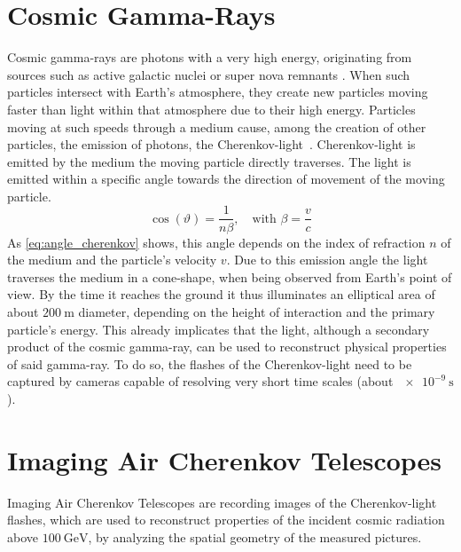 \section{Cosmic Gamma-Rays}
%
Cosmic gamma-rays are photons with a very high energy, originating from sources such as active galactic nuclei or super nova remnants \cite{FACT-Design}. When such particles intersect
with Earth's atmosphere, they create new particles moving faster than light
within that atmosphere due to their high energy. Particles moving at such
speeds through a medium cause, among the creation of other particles, the
emission of photons, the Cherenkov-light~\cite{Cherenkov}.
Cherenkov-light is emitted by the medium the moving particle directly traverses.
The light is emitted within a specific angle towards the direction of movement of the moving particle.
%
\begin{equation}
    \cos(\vartheta) = \frac{1}{n\beta}, \quad \text{with } \beta=\frac{v}{c}
    \label{eq:angle_cherenkov}
\end{equation}
%
As \autoref{eq:angle_cherenkov} shows, this angle depends on the index of
refraction $n$ of the medium and the particle's velocity $v$. Due to this emission
angle the light traverses the medium in a cone-shape, when being observed from
Earth's point of view. By the time it reaches the ground it thus
illuminates an elliptical area of about $\SI{200}{\meter}$ diameter, depending
on the height of interaction and the primary particle's energy.
This already implicates that the light, although a secondary product of the
cosmic gamma-ray, can be used to reconstruct physical properties of
said gamma-ray. To do so, the flashes of the Cherenkov-light need to
be captured by cameras capable of resolving very short time scales (about
$\SI{e-9}{\second}$).

\section{Imaging Air Cherenkov Telescopes}\label{sec:iact}

Imaging Air Cherenkov Telescopes are recording images of the Cherenkov-light flashes, which are used to
reconstruct properties of the incident cosmic radiation above
$\SI{100}{\giga\electronvolt}$, by analyzing the spatial geometry of the
measured pictures.

